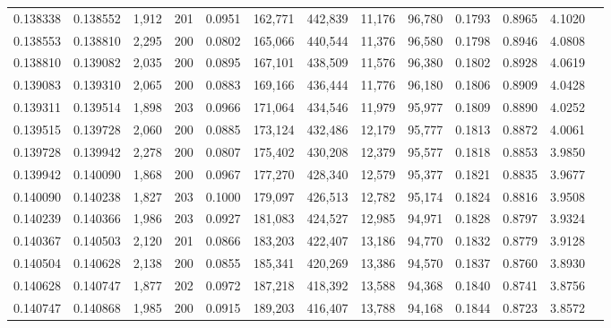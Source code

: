 \begin{tabular}{rrrrrrrrrrrrr}
0.138338 & 0.138552 & 1,912 & 201 &                                     0.0951 & 162,771 & 442,839 &  11,176 &  96,780 & 0.1793 & 0.8965 & 4.1020 \\
0.138553 & 0.138810 & 2,295 & 200 &                                     0.0802 & 165,066 & 440,544 &  11,376 &  96,580 & 0.1798 & 0.8946 & 4.0808 \\
0.138810 & 0.139082 & 2,035 & 200 &                                     0.0895 & 167,101 & 438,509 &  11,576 &  96,380 & 0.1802 & 0.8928 & 4.0619 \\
0.139083 & 0.139310 & 2,065 & 200 &                                     0.0883 & 169,166 & 436,444 &  11,776 &  96,180 & 0.1806 & 0.8909 & 4.0428 \\
0.139311 & 0.139514 & 1,898 & 203 &                                     0.0966 & 171,064 & 434,546 &  11,979 &  95,977 & 0.1809 & 0.8890 & 4.0252 \\
0.139515 & 0.139728 & 2,060 & 200 &                                     0.0885 & 173,124 & 432,486 &  12,179 &  95,777 & 0.1813 & 0.8872 & 4.0061 \\
0.139728 & 0.139942 & 2,278 & 200 &                                     0.0807 & 175,402 & 430,208 &  12,379 &  95,577 & 0.1818 & 0.8853 & 3.9850 \\
0.139942 & 0.140090 & 1,868 & 200 &                                     0.0967 & 177,270 & 428,340 &  12,579 &  95,377 & 0.1821 & 0.8835 & 3.9677 \\
0.140090 & 0.140238 & 1,827 & 203 &                                     0.1000 & 179,097 & 426,513 &  12,782 &  95,174 & 0.1824 & 0.8816 & 3.9508 \\
0.140239 & 0.140366 & 1,986 & 203 &                                     0.0927 & 181,083 & 424,527 &  12,985 &  94,971 & 0.1828 & 0.8797 & 3.9324 \\
0.140367 & 0.140503 & 2,120 & 201 &                                     0.0866 & 183,203 & 422,407 &  13,186 &  94,770 & 0.1832 & 0.8779 & 3.9128 \\
0.140504 & 0.140628 & 2,138 & 200 &                                     0.0855 & 185,341 & 420,269 &  13,386 &  94,570 & 0.1837 & 0.8760 & 3.8930 \\
0.140628 & 0.140747 & 1,877 & 202 &                                     0.0972 & 187,218 & 418,392 &  13,588 &  94,368 & 0.1840 & 0.8741 & 3.8756 \\
0.140747 & 0.140868 & 1,985 & 200 &                                     0.0915 & 189,203 & 416,407 &  13,788 &  94,168 & 0.1844 & 0.8723 & 3.8572 \\

\end{tabular}
